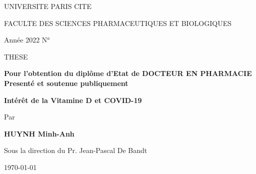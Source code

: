 
\begin{centering}
\large

UNIVERSITE PARIS CITE

FACULTE DES SCIENCES PHARMACEUTIQUES ET BIOLOGIQUES

\vspace{1 cm}

Année 2022 \hfill \hfill N°

\vspace{2cm}
THESE

\vspace{1cm} \Large \textbf{Pour l'obtention du diplôme d'Etat de DOCTEUR EN PHARMACIE Presenté et soutenue publiquement}


\Large \textbf {Intérêt de la Vitamine D et COVID-19} \vspace{2 cm}

\large Par \vspace{0.5 cm}

\Large \textbf{HUYNH Minh-Anh} \vspace{1 cm}

\large Sous la direction du Pr. Jean-Pascal De Bandt

\today

\end{centering}
\clearpage
